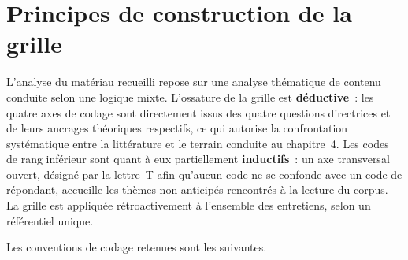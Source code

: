 
\section{Principes de construction de la grille}

L'analyse du matériau recueilli repose sur une analyse thématique de contenu conduite
selon une logique mixte. L'ossature de la grille est \textbf{déductive}~: les quatre
axes de codage sont directement issus des quatre questions directrices et de leurs
ancrages théoriques respectifs, ce qui autorise la confrontation systématique entre la
littérature et le terrain conduite au chapitre~4. Les codes de rang inférieur sont
quant à eux partiellement \textbf{inductifs}~: un axe transversal ouvert, désigné par
la lettre~T afin qu'aucun code ne se confonde avec un code de répondant, accueille les
thèmes non anticipés rencontrés à la lecture du corpus. La grille est appliquée
rétroactivement à l'ensemble des entretiens, selon un référentiel unique.

Les conventions de codage retenues sont les suivantes.

